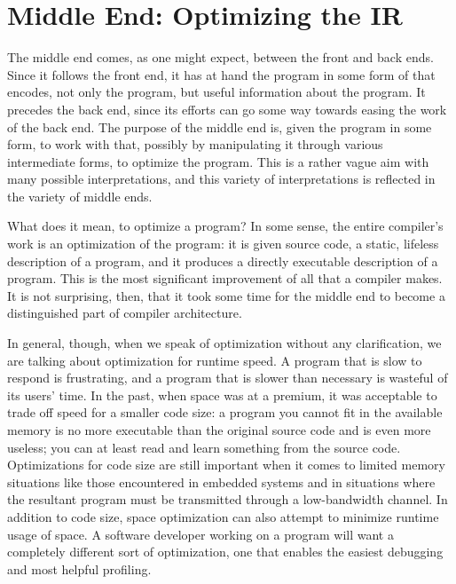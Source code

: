 \section{Middle End: Optimizing the IR}
The middle end comes, as one might expect, between the front and back ends. Since it follows the front end, it has at hand the program in some form of \IR that encodes, not only the program, but useful information about the program. It precedes the back end, since its efforts can go some way towards easing the work of the back end. The purpose of the middle end is, given the program in some form, to work with that, possibly by manipulating it through various intermediate forms, to optimize the program. This is a rather vague aim with many possible interpretations, and this variety of interpretations is reflected in the variety of middle ends.

What does it mean, to optimize a program? In some sense, the entire compiler's work is an optimization of the program: it is given source code, a static, lifeless description of a program, and it produces a directly executable description of a program. This is the most significant improvement of all that a compiler makes. It is not surprising, then, that it took some time for the middle end to become a distinguished part of compiler architecture.

In general, though, when we speak of optimization without any clarification, we are talking about optimization for runtime speed. A program that is slow to respond is frustrating, and a program that is slower than necessary is wasteful of its users' time. In the past, when space was at a premium, it was acceptable to trade off speed for a smaller code size: a program you cannot fit in the available memory is no more executable than the original source code and is even more useless; you can at least read and learn something from the source code. Optimizations for code size are still important when it comes to limited memory situations like those encountered in embedded systems and in situations where the resultant program must be transmitted through a low-bandwidth channel. In addition to code size, space optimization can also attempt to minimize runtime usage of space. A software developer working on a program will want a completely different sort of optimization, one that enables the easiest debugging and most helpful profiling.

